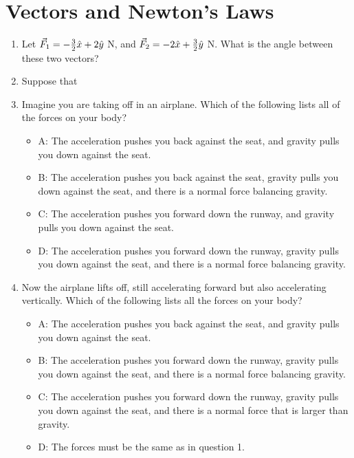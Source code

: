 \documentclass[10pt]{article}
\begin{document}
\maketitle

\section{Vectors and Newton's Laws}
\begin{enumerate}
\item Let $\vec{F}_{\rm 1} = -\frac{3}{2}\hat{x} + 2\hat{y}$ N, and $\vec{F}_{\rm 2} = -2\hat{x} + \frac{3}{2}\hat{y}$ N.  What is the angle between these two vectors?  \vspace{1.5 cm}
\item Suppose that 
\item Imagine you are taking off in an airplane.  Which of the following lists all of the forces on your body? \\
\begin{itemize}
\item A: The acceleration pushes you back against the seat, and gravity pulls you down against the seat.
\item B: The acceleration pushes you back against the seat, gravity pulls you down against the seat, and there is a normal force balancing gravity.
\item C: The acceleration pushes you forward down the runway, and gravity pulls you down against the seat.
\item D: The acceleration pushes you forward down the runway, gravity pulls you down against the seat, and there is a normal force balancing gravity.
\end{itemize}
\item Now the airplane lifts off, still accelerating forward but also accelerating vertically.  Which of the following lists all the forces on your body? \\
\begin{itemize}
\item A: The acceleration pushes you back against the seat, and gravity pulls you down against the seat.
\item B: The acceleration pushes you forward down the runway, gravity pulls you down against the seat, and there is a normal force balancing gravity.
\item C: The acceleration pushes you forward down the runway, gravity pulls you down against the seat, and there is a normal force that is larger than gravity.
\item D: The forces must be the same as in question 1.
\end{itemize}
\end{enumerate}
\end{document}
